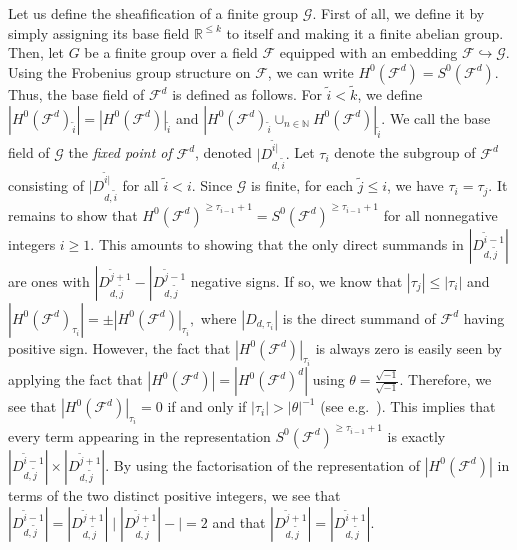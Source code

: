 \documentclass[a4paper,reqno,oneside]{article}
\begin{document}
Let us define the sheafification of a finite group $\mathcal{G}$. First of all, we define it by simply assigning its base field $\mathbb{R}^{\leq k}$ to itself and making it a finite abelian group. Then, let $G$ be a finite group over a field $\mathcal{F}$ equipped with an embedding $\mathcal{F}\hookrightarrow \mathcal{G}$. Using the Frobenius group structure on $\mathcal{F}$, we can write $H^0(\mathcal{F}^d)=S^0(\mathcal{F}^d)$. Thus, the base field of $\mathcal{F}^d$ is defined as follows. For $\tilde{i}< \tilde{k}$, we define $|H^0(\mathcal{F}^d)_{\tilde{i}}|=|H^0(\mathcal{F}^d)|_{\tilde{i}}$ and $|H^0(\mathcal{F}^d)_{\tilde{i}}\cup_{n \in \mathbb{N}} H^0(\mathcal{F}^d)|_{\tilde{i}}$. We call the base field of $\mathcal{G}$ the {\em fixed point of} $\mathcal{F}^d$, denoted $|D_{d,\tilde{i}}^{\tilde{i}|}.$ Let $\tau_i$ denote the subgroup of $\mathcal{F}^d$ consisting of $|D_{d,\tilde{i}}^{\tilde{i}|}$ for all $\tilde{i}< i$. Since $\mathcal{G}$ is finite, for each $\tilde{j}\leq i$, we have $\tau_i=\tau_j.$ It remains to show that $H^0(\mathcal{F}^d)^{\geq \tau_{i-1}+1}=S^0(\mathcal{F}^d)^{\geq \tau_{i-1}+1}$ for all nonnegative integers $i\geq 1.$ This amounts to showing that the only direct summands in $|D_{d,\tilde{j}}^{\tilde{i}-1}|$ are ones with $|D_{d,\tilde{j}}^{\tilde{j}+1}-|D_{d,\tilde{j}}^{\tilde{j}-1}$ negative signs. If so, we know that $|\tau_j|\leq |\tau_i|$ and $|H^0(\mathcal{F}^d)_{\tau_i}|=\pm |H^0(\mathcal{F}^d)|_{\tau_i},$ where $|D_{d,\tau_i}|$ is the direct summand of $\mathcal{F}^d$ having positive sign. However, the fact that $|H^0(\mathcal{F}^d)|_{\tau_i}$ is always zero is easily seen by applying the fact that $|H^0(\mathcal{F}^d)|=|H^0(\mathcal{F}^d)^d|$ using $\theta=\frac{\sqrt{-1}}{\sqrt{-1}}$. Therefore, we see that $|H^0(\mathcal{F}^d)|_{\tau_i}=0$ if and only if $|\tau_i|>|\theta|^{-1}$ (see e.g.~\cite[Section~5.3]{Pries:AbelianGroups}). This implies that every term appearing in the representation $S^0(\mathcal{F}^d)^{\geq \tau_{i-1}+1}$ is exactly $|D_{d,\tilde{j}}^{\tilde{i}-1}|\times |D_{d,\tilde{j}}^{\tilde{j}+1}|.$ By using the factorisation of the representation of $|H^0(\mathcal{F}^d)|$ in terms of the two distinct positive integers, we see that $|D_{d,\tilde{j}}^{\tilde{i}-1}| = |D_{d,\tilde{j}}^{\tilde{j}+1}| \mid |D_{d,\tilde{j}}^{\tilde{j}+1}|-\mid = 2$ and that $|D_{d,\tilde{j}}^{\tilde{j}+1}|= |D_{d,\tilde{j}}^{\tilde{i}+1}|.$ 
\end{document}
